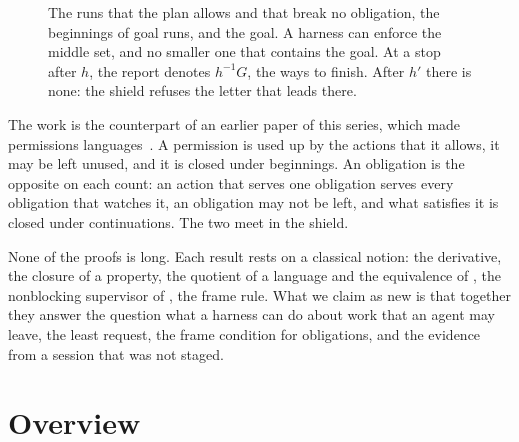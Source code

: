 \documentclass[acmsmall,nonacm,screen]{acmart}
\newcommand{\kw}[1]{\mathsf{#1}}
\newcommand{\pre}[1]{\kw{Pre}(#1)}
\begin{document}
\begin{figure}
\centering
{}
\caption{The runs that the plan allows and that break no obligation, the beginnings of goal
runs, and the goal. A harness can enforce the middle set, and no smaller one that contains the goal. At a stop
after $h$, the report denotes $h^{-1}G$, the ways to finish. After $h'$ there is none: the shield
refuses the letter that leads there.}
\label{fig:sets}
\end{figure}

The work is the counterpart of an earlier paper of this series, which made permissions
languages~\cite{tpp11}. A permission is used up by the actions that it allows, it may be left
unused, and it is closed under beginnings. An obligation is the opposite on each count: an
action that serves one obligation serves every obligation that watches it, an obligation may
not be left, and what satisfies it is closed under continuations. The two meet in the
shield.

None of the proofs is long. Each result rests on a classical notion: the derivative, the
closure of a property, the quotient of a language and the equivalence of
\citet{nerode1958}, the nonblocking supervisor of \citet{ramadge1987}, the frame rule. What
we claim as new is that together they answer the question what a harness can do about work
that an agent may leave, the least request, the frame condition for obligations, and the
evidence from a session that was not staged.

\section{Overview}
\label{sec:overview}
\end{document}
